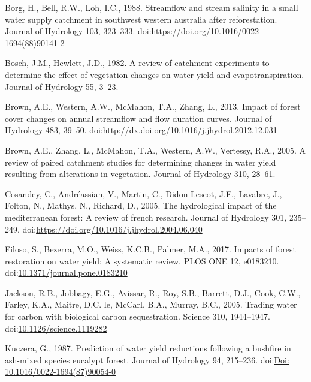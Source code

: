 \documentclass[]{elsarticle} %
\begin{document}
\leavevmode\hypertarget{ref-borg1988}{}%
Borg, H., Bell, R.W., Loh, I.C., 1988. Streamflow and stream salinity in
a small water supply catchment in southwest western australia after
reforestation. Journal of Hydrology 103, 323--333.
doi:\href{https://doi.org/https://doi.org/10.1016/0022-1694(88)90141-2}{https://doi.org/10.1016/0022-1694(88)90141-2}

\leavevmode\hypertarget{ref-hewlett1984}{}%
Bosch, J.M., Hewlett, J.D., 1982. A review of catchment experiments to
determine the effect of vegetation changes on water yield and
evapotranspiration. Journal of Hydrology 55, 3--23.

\leavevmode\hypertarget{ref-brown2013}{}%
Brown, A.E., Western, A.W., McMahon, T.A., Zhang, L., 2013. Impact of
forest cover changes on annual streamflow and flow duration curves.
Journal of Hydrology 483, 39--50.
doi:\href{https://doi.org/http://dx.doi.org/10.1016/j.jhydrol.2012.12.031}{http://dx.doi.org/10.1016/j.jhydrol.2012.12.031}

\leavevmode\hypertarget{ref-brown2005}{}%
Brown, A.E., Zhang, L., McMahon, T.A., Western, A.W., Vertessy, R.A.,
2005. A review of paired catchment studies for determining changes in
water yield resulting from alterations in vegetation. Journal of
Hydrology 310, 28--61.

\leavevmode\hypertarget{ref-cosandey2005}{}%
Cosandey, C., Andréassian, V., Martin, C., Didon-Lescot, J.F., Lavabre,
J., Folton, N., Mathys, N., Richard, D., 2005. The hydrological impact
of the mediterranean forest: A review of french research. Journal of
Hydrology 301, 235--249.
doi:\href{https://doi.org/https://doi.org/10.1016/j.jhydrol.2004.06.040}{https://doi.org/10.1016/j.jhydrol.2004.06.040}

\leavevmode\hypertarget{ref-filoso2017}{}%
Filoso, S., Bezerra, M.O., Weiss, K.C.B., Palmer, M.A., 2017. Impacts of
forest restoration on water yield: A systematic review. PLOS ONE 12,
e0183210.
doi:\href{https://doi.org/10.1371/journal.pone.0183210}{10.1371/journal.pone.0183210}

\leavevmode\hypertarget{ref-jackson2005}{}%
Jackson, R.B., Jobbagy, E.G., Avissar, R., Roy, S.B., Barrett, D.J.,
Cook, C.W., Farley, K.A., Maitre, D.C. le, McCarl, B.A., Murray, B.C.,
2005. Trading water for carbon with biological carbon sequestration.
Science 310, 1944--1947.
doi:\href{https://doi.org/10.1126/science.1119282}{10.1126/science.1119282}

\leavevmode\hypertarget{ref-kuczera1987}{}%
Kuczera, G., 1987. Prediction of water yield reductions following a
bushfire in ash-mixed species eucalypt forest. Journal of Hydrology 94,
215--236.
doi:\href{https://doi.org/Doi:\%2010.1016/0022-1694(87)90054-0}{Doi: 10.1016/0022-1694(87)90054-0}
\end{document}
